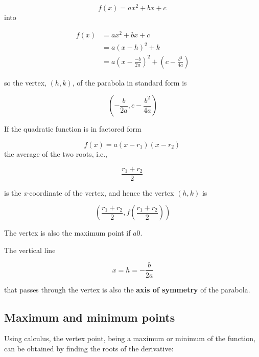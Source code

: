 $$f(x) = a x^2 + b x + c \,$$ into



\begin{align} f(x) &= ax^2 + bx + c \\ &= a(x - h)^2 + k \\ &= a\left(x - \frac{-b}{2a}\right)^2 + \left(c - \frac{b^2}{4a}\right) \end{align}





so the vertex, $(h, k)$, of the parabola in standard form is



$$\left(-\frac{b}{2a}, c - \frac{b^2}{4a}\right)$$



If the quadratic function is in factored form



$$f(x) = a(x - r _1)(x - r _2) \,$$ the average of the two roots, i.e.,



$$\frac{r _1 + r _2}{2} \,$$



is the \textit{x}-coordinate of the vertex, and hence the vertex $(h, k)$ is



$$\left(\frac{r _1 + r _2}{2}, f\left(\frac{r _1 + r _2}{2}\right)\right)$$



The vertex is also the maximum point if $a0$.



The vertical line



$$x=h=-\frac{b}{2a}$$



that passes through the vertex is also the \textbf{axis of symmetry} of the parabola.




\subsection{Maximum and minimum points}
\label{sss:maxi-056e}




Using calculus, the vertex point, being a maximum or minimum of the function, can be
obtained by finding the roots of the derivative:




